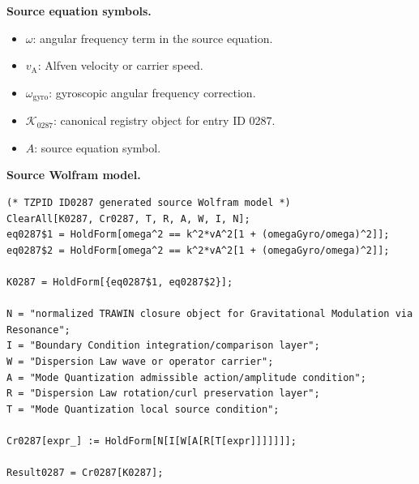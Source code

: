 \begin{minipage}[t]{0.49\linewidth}
\begingroup
\small
\raggedright
\textbf{Source equation symbols.}\par
\begin{itemize}[leftmargin=1.35em,itemsep=1pt,topsep=1pt,parsep=0pt]
    \item $\omega$: angular frequency term in the source equation.
    \item $v_{\mathrm{A}}$: Alfven velocity or carrier speed.
    \item $\omega_{\mathrm{gyro}}$: gyroscopic angular frequency correction.
    \item $\mathcal{K}_{0287}$: canonical registry object for entry ID 0287.
    \item $A$: source equation symbol.
\end{itemize}
\endgroup
\end{minipage}\hfill
\begin{minipage}[t]{0.47\linewidth}
\begingroup
\scriptsize
\raggedright
\textbf{Source Wolfram model.}\par
\begin{Verbatim}[fontsize=\tiny,breaklines=true,breakanywhere=true]
(* TZPID ID0287 generated source Wolfram model *)
ClearAll[K0287, Cr0287, T, R, A, W, I, N];
eq0287$1 = HoldForm[omega^2 == k^2*vA^2[1 + (omegaGyro/omega)^2]];
eq0287$2 = HoldForm[omega^2 == k^2*vA^2[1 + (omegaGyro/omega)^2]];

K0287 = HoldForm[{eq0287$1, eq0287$2}];

N = "normalized TRAWIN closure object for Gravitational Modulation via Resonance";
I = "Boundary Condition integration/comparison layer";
W = "Dispersion Law wave or operator carrier";
A = "Mode Quantization admissible action/amplitude condition";
R = "Dispersion Law rotation/curl preservation layer";
T = "Mode Quantization local source condition";

Cr0287[expr_] := HoldForm[N[I[W[A[R[T[expr]]]]]]];

Result0287 = Cr0287[K0287];
\end{Verbatim}
\endgroup
\end{minipage}

